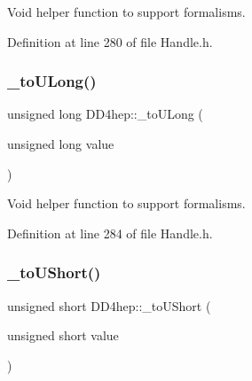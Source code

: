 Void helper function to support formalisms. 



Definition at line 280 of file Handle.\+h.

\hypertarget{group___d_d4_h_e_p___g_e_o_m_e_t_r_y_gac59edb5f6a7d0fe5aa11255ef5b48bae}{}\label{group___d_d4_h_e_p___g_e_o_m_e_t_r_y_gac59edb5f6a7d0fe5aa11255ef5b48bae} 
\subsubsection{\texorpdfstring{\+\_\+to\+U\+Long()}{\_toULong()}}
{\footnotesize\ttfamily unsigned long D\+D4hep\+::\+\_\+to\+U\+Long (\begin{DoxyParamCaption}\item[{unsigned long}]{value }\end{DoxyParamCaption})\hspace{0.3cm}{\ttfamily [inline]}}



Void helper function to support formalisms. 



Definition at line 284 of file Handle.\+h.

\hypertarget{group___d_d4_h_e_p___g_e_o_m_e_t_r_y_gaff8a702098e20c2aa071703222b5a73e}{}\label{group___d_d4_h_e_p___g_e_o_m_e_t_r_y_gaff8a702098e20c2aa071703222b5a73e} 
\subsubsection{\texorpdfstring{\+\_\+to\+U\+Short()}{\_toUShort()}}
{\footnotesize\ttfamily unsigned short D\+D4hep\+::\+\_\+to\+U\+Short (\begin{DoxyParamCaption}\item[{unsigned short}]{value }\end{DoxyParamCaption})\hspace{0.3cm}{\ttfamily [inline]}}



